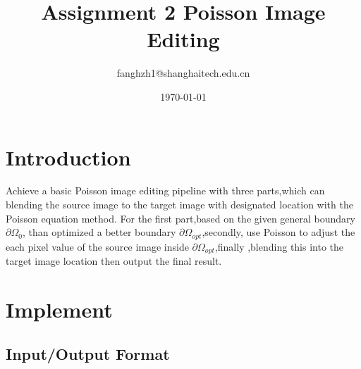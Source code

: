\documentclass[letterpaper,12pt]{article}
\begin{document}
\title{Assignment 2 Poisson Image Editing}
\author{fanghzh1@shanghaitech.edu.cn}
\date{\today}
\maketitle


\tableofcontents
\section{Introduction}
Achieve a basic Poisson image editing pipeline with three parts,which can blending the source image to the target image with designated location with the Poisson equation method.
For the first part,based on the given general boundary $\partial \Omega_0$, than optimized a better boundary $\partial \Omega_{opt}$,secondly, use Poisson to adjust the each pixel value of the source image inside $\partial \Omega_{opt}$,finally ,blending this into the target image location then output the final result.

\section{Implement}
\subsection{Input/Output Format}
\end{document}
